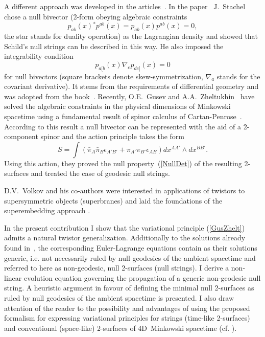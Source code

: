 \documentclass[a4paper,twocolumn,showkeys,showpacs,aps]{revtex4}
\begin{document}
A different approach was developed in the
articles~\cite{Stachel,Gusev-Zheltukhin}. In the
paper~\cite{Stachel} J.~Stachel chose a null bivector (2-form
obeying algebraic constraints
\begin{equation}
p_{ab}(x){}^*p^{ab}(x)=p_{ab}(x)p^{ab}(x)=0,
\end{equation}
the star stands for duality operation) as the Lagrangian density
and showed that Schild's null strings can be described in this
way. He also imposed the integrability condition
\begin{equation}
p_{a[b}(x)\nabla_{c}p_{de]}(x)=0%
\label{DiffCon}
\end{equation}
for null bivectors (square brackets denote
skew-sym\-met\-ri\-za\-tion, $\nabla_a$ stands for the covariant
de\-ri\-va\-ti\-ve). It stems from the requirements of
differential geometry and was adopted from the
book~\cite{Schouten}. Recently, O.E.~Gusev and
A.A.~Zheltukhin~\cite{Gusev-Zheltukhin} have solved the algebraic
constraints in the physical dimensions of Minkowski spacetime
using a fundamental result of spinor calculus of
Cartan-Penrose~\cite[Vol. 1]{SST}. According to this result a null
bivector can be represented with the aid of a 2-component spinor
and the action principle takes the form
\begin{equation}
S = \int (\bar{\pi}_{A}\bar{\pi}_{B}\epsilon_{A'B'}\! +
\pi_{A'}\pi_{B'}\epsilon_{AB}) dx^{AA'}\!\!\! \wedge
dx^{BB'}\!\!\!.%
\label{GusZhelt}
\end{equation}
Using this action, they proved the null property~(\ref{NullDet})
of the resulting 2-surfaces and treated the case of geodesic null
strings.

D.V.~Volkov and his co-authors were interested in applications of
twistors to supersymmetric  objects (superbranes) and laid the
foundations of the superembedding approach
\cite{Volkov:1988vf,Sorokin:1989zi,Sorokin:1989nj}.

In the present contribution I show that the variational principle
(\ref{GusZhelt}) admits a natural twistor generalization.
Additionally to the solutions already found
in~\cite{Gusev-Zheltukhin}, the corresponding Euler-Lagrange
equations contain as their solutions generic, i.e. not necessarily
ruled by null geodesics of the ambient spacetime and referred to
here as non-geodesic, null 2-surfaces (null strings). I derive a
non-linear evolution equation governing the propagation of a
generic non-geodesic null string. A heuristic argument in favour
of defining the minimal null 2-surfaces as ruled by null geodesics
of the ambient spacetime is presented. I also draw attention of
the reader to the possibility and advantages of using the proposed
formalism for expressing variational principles for strings
(time-like 2-surfaces) and conventional (space-like) 2-surfaces of
4D~Minkowski spacetime (cf. \cite{Gusev-Zheltukhin}).
\end{document}
